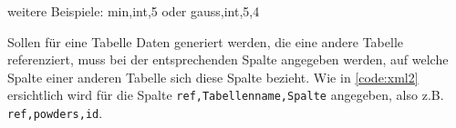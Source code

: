 \documentclass[11pt]{report}
\begin{document}
weitere Beispiele: min,int,5 oder gauss,int,5,4

\bigskip\noindent
Sollen für eine Tabelle Daten generiert werden, die eine andere Tabelle referenziert, muss bei der entsprechenden Spalte angegeben werden, auf welche Spalte einer anderen Tabelle sich diese Spalte bezieht. Wie in \autoref{code:xml2} ersichtlich wird für die Spalte \texttt{ref,Tabellenname,Spalte} angegeben, also z.B. \texttt{ref,powders,id}.

\begin{figure}[h]
	\centering
	\begin{minipage}{0.9\textwidth}
		
	\end{minipage}
\end{figure}
\end{document}
